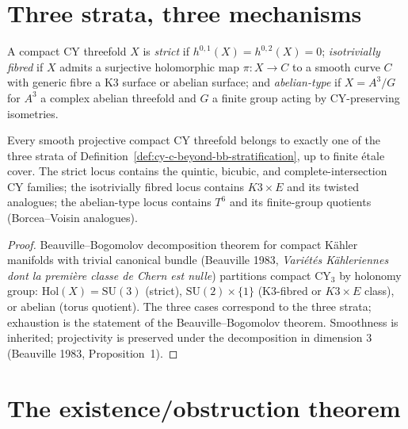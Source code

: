 \section{Three strata, three mechanisms}
\label{sec:cy-c-beyond-three-strata}

\begin{definition}
\label{def:cy-c-beyond-bb-stratification}
A compact CY threefold $X$ is \emph{strict} if $h^{0,1}(X) = h^{0,2}(X) = 0$;
\emph{isotrivially fibred} if $X$ admits a surjective holomorphic map
$\pi : X \to C$ to a smooth curve $C$ with generic fibre a K3 surface or
abelian surface; and \emph{abelian-type} if $X = A^3 / G$ for $A^3$ a complex
abelian threefold and $G$ a finite group acting by CY-preserving isometries.
\end{definition}

\begin{proposition}
\label{prop:cy-c-beyond-tri-stratum-exhaustive}
Every smooth projective compact CY threefold belongs to exactly one of the three
strata of Definition~\ref{def:cy-c-beyond-bb-stratification}, up to finite \'etale
cover. The strict locus contains the quintic, bicubic, and complete-intersection CY
families; the isotrivially fibred locus contains
$K3 \times E$ and its twisted analogues; the abelian-type locus contains $T^6$ and its
finite-group quotients (Borcea--Voisin analogues).
\end{proposition}

\begin{proof}
Beauville--Bogomolov decomposition theorem for compact K\"ahler manifolds with trivial
canonical bundle (Beauville 1983, \emph{Vari\'et\'es K\"ahleriennes dont la premi\`ere
classe de Chern est nulle}) partitions compact CY$_3$ by holonomy group:
$\mathrm{Hol}(X) = \mathrm{SU}(3)$ (strict), $\mathrm{SU}(2) \times \{1\}$
(K3-fibred or $K3 \times E$ class), or abelian (torus quotient).
The three cases correspond to the three strata; exhaustion is the statement of the
Beauville--Bogomolov theorem. Smoothness is inherited; projectivity is preserved
under the decomposition in dimension $3$ (Beauville 1983, Proposition~1).
\end{proof}

\section{The existence/obstruction theorem}
\label{sec:cy-c-beyond-existence}

